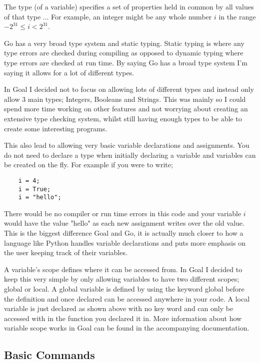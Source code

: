 \begin{displayquote}
The type (of a variable) specifies a set of properties held in common by all values of that type ... For example, an integer might be any whole number $i$ in the range $-2^{31} \leq i < 2^{31}$.
\end{displayquote}

Go has a very broad type system and static typing. Static typing is where any type errors are checked during compiling as opposed to dynamic typing where type errors are checked at run time. By saying Go has a broad type system I'm saying it allows for a lot of different types.

In Goal I decided not to focus on allowing lots of different types and instead only allow 3 main types; Integers,  Booleans and Strings. This was mainly so I could spend more time working on other features and not worrying about creating an extensive type checking system, whilst still having enough types to be able to create some interesting programs. 

This also lead to allowing very basic variable declarations and assignments. You do not need to declare a type when initially declaring a variable and variables can be created on the fly. For example if you were to write;

\begin{lstlisting}
	i = 4;
	i = True;
	i = "hello";
\end{lstlisting}

There would be no compiler or run time errors in this code and your variable $i$ would have the value "hello" as each new assignment writes over the old value. This is the biggest difference Goal and Go, it is actually much closer to how a language like Python handles variable declarations and puts more emphasis on the user keeping track of their variables.

A variable's scope defines where it can be accessed from. In Goal I decided to keep this very simple by only allowing variables to have two different scopes; global or local. A global variable is defined by using the keyword global before the definition and once declared can be accessed anywhere in your code. A local variable is just declared as shown above with no key word and can only be accessed with in the function you declared it in. More information about how variable scope works in Goal can be found in the accompanying documentation.     


\subsection{Basic Commands}

